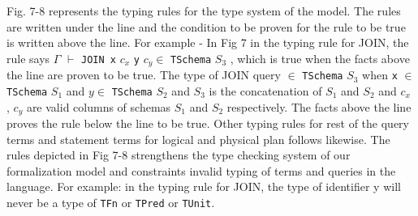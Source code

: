 Fig. 7-8 represents the typing rules for the type system of the model. The rules are written under the line and the condition to be proven for the rule to be true is written above the line. For example - In Fig 7 in the typing rule for JOIN, the rule says \newline $\Gamma$ $\vdash$ \texttt{JOIN \:x} \:$c_x$ \texttt{\:y} \:$c_y \in$ \texttt{TSchema} \:$S_3$ ,\: which is true when the facts above the line are proven to be true. The type of JOIN query $\in$ \texttt{TSchema} \:$S_3$ when \texttt{x} $\in$ \: \texttt{TSchema} \:$S_1$ and $y \in$ \: \texttt{TSchema} \:$S_2$ and $S_3$ is the concatenation of $S_1$ and $S_2$ and $c_x$ , $c_y$ are valid columns of schemas $S_1$ and $S_2$ respectively. The facts above the line proves the rule below the line to be true. Other typing rules for rest of the query terms and statement terms for logical and physical plan follows likewise.
The rules depicted in Fig 7-8 strengthens the type checking system of our formalization model and constraints invalid typing of terms and queries in the language. For example: in the typing rule for JOIN, the type of identifier y will never be a type of \texttt{TFn} or \texttt{TPred} or \texttt{TUnit}.
